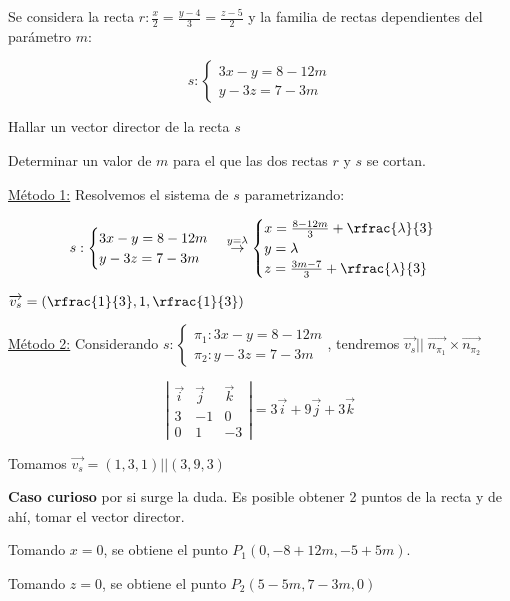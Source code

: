 \documentclass[palatino,nosec,nochap,nobuilddate]{Docencia}
\renewcommand{\vec}[1]{\overrightarrow{#1}}
\begin{document}
\begin{problem}

Se considera la recta $r: \frac{x}{2} = \frac{y-4}{3} = \frac{z-5}{2}$ y la familia de rectas dependientes del parámetro $m$:

\[
	s: \begin{cases} 3x-y=8-12m\\y-3z = 7-3m \end{cases}
\]

\ppart Hallar un vector director de la recta $s$

\ppart Determinar un valor de $m$ para el que las dos rectas $r$ y $s$ se cortan.

\solution

\spart \ul{Método 1:} Resolvemos el sistema de $s$ parametrizando:

\[
	s: \begin{cases} 3x-y=8-12m\\y-3z = 7-3m \end{cases} \overset{y=\lambda}{\to} \begin{cases}
	x = \frac{8-12m}{3} + \rfrac{\lambda}{3}\\
	y = \lambda \\
	z = \frac{3m-7}{3} + \rfrac{\lambda}{3}
	\end{cases}
\]

$\vec{v_s} = \left(\rfrac{1}{3},1,\rfrac{1}{3}\right)$

\ul{Método 2:} Considerando $s:\begin{cases}
\pi_1:3x-y=8-12m
 \\
\pi_2:y-3z = 7-3m
\end{cases}$, tendremos $\vec{v_s} ||\; \vec{n_{\pi_1}}\times \vec{n_{\pi_2}}$

\[
\left|\begin{matrix}
\vec{i} & \vec{j} & \vec{k}\\
3&-1&0\\
0&1&-3
\end{matrix}\right| = 3\vec{i} + 9\vec{j} + 3\vec{k}
\]

Tomamos $\vec{v_s} = (1,3,1) || (3,9,3)$

\obs \textbf{Caso curioso} por si surge la duda. Es posible obtener 2 puntos de la recta y de ahí, tomar el vector director. 

Tomando $x=0$, se obtiene el punto $P_1\left(0,-8+12m,-5+5m\right)$.

Tomando $z=0$, se obtiene el punto $P_2\left(5-5m,7-3m,0\right)$


\end{problem}
\end{document}
